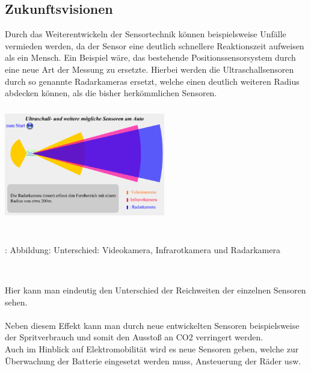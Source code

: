 \documentclass{article}
\begin{document}
		
		
		\subsection{Zukunftsvisionen} 
 			Durch das Weiterentwickeln der Sensortechnik können beispielsweise Unfälle vermieden werden, da der Sensor eine deutlich schnellere Reaktionszeit aufweisen als ein Mensch. Ein Beispiel wäre, das bestehende Positionssensorsystem durch eine neue Art der Messung zu ersetzte. Hierbei werden die Ultraschallsensoren durch so genannte Radarkameras ersetzt, welche einen deutlich weiteren Radius abdecken können, als die bisher herkömmlichen Sensoren.\\
 			
 			\begin{center}
 				\includegraphics[width=7cm, height=5cm] {Images/Kapitel5/radarsensor.png}
 				\caption {\\\cite{TS34}: Abbildung: Unterschied: Videokamera, Infrarotkamera und Radarkamera}
 			\end{center}\\

			\begin{flushleft}
							
				Hier kann man eindeutig den Unterschied der Reichweiten der einzelnen Sensoren sehen.\\
				\\
				
				Neben diesem Effekt kann man durch neue entwickelten Sensoren beispielsweise der Spritverbrauch und somit den Ausstoß an CO2 verringert werden.\\
				Auch im Hinblick auf Elektromobilität wird es neue Sensoren geben, welche zur Überwachung der Batterie eingesetzt werden muss, Ansteuerung der Räder usw.
				
			\end{flushleft} 
			
\end{document}
